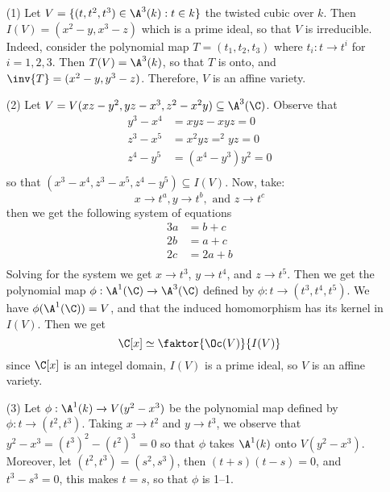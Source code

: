 \begin{example}\label{example_2.1}
  \begin{enumerate}
    \item[(1)] Let $V=\{(t,t^2,t^3) \in \A^3(k) : t \in k\}$ the twisted cubic
      over $k$. Then  $I(V)=(x^2-y,x^3-z)$ which is a prime ideal, so that $V$
      is irreducible. Indeed, consider the polynomial map $T=(t_1,t_2,t_3)$
      where $t_i: t \xrightarrow{} t^i$ for $i=1,2,3$. Then $T(V)=\A^3(k)$, so
      that $T$ is onto, and $\inv{T}=(x^2-y,y^3-z)$. Therefore, $V$ is an affine
      variety.

    \item[(2)] Let $V=V(xz-y^2,yz-x^3,z^2-x^2y) \subseteq \A^3(\C)$. Observe
      that
      \begin{align*}
        y^3-x^4 &=  xyz-xyz=0 \\
        z^3-x^5 &=  x^2yz=^2yz=0  \\
        z^4-y^5 &=(x^4-y^3)y^2=0  \\
      \end{align*}
      so that $(x^3-x^4,z^3-x^5,z^4-y^5) \subseteq I(V)$. Now, take:
      \begin{equation*}
        x \xrightarrow{} t^a, y \xrightarrow{} t^b, \text{ and } z
        \xrightarrow{} t^c
      \end{equation*}
      then we get the following system of equations
      \begin{align*}
        3a  &=  b+c \\
        2b  &=  a+c \\
        2c  &=  2a+b  \\
      \end{align*}
      Solving for the system we get $x \xrightarrow{} t^3$, $y \xrightarrow{}
      t^4$, and $z \xrightarrow{} t^5$. Then we get the polynomial map
      $\phi:\A^1(\C) \xrightarrow{} \A^3(\C)$ defined by $\phi:t \xrightarrow{}
      (t^3,t^4,t^5)$. We have $\phi(\A^1(\C))=V$, and that the induced
      homomorphism has its kernel in $I(V)$. Then we get
      \begin{equation*}
        \C[x] \simeq \faktor{\Oc(V)}{I(V)}
      \end{equation*}
      since $\C[x]$ is an integel domain, $I(V)$ is a prime ideal, so $V$ is an
      affine variety.

    \item[(3)] Let $\phi:\A^1(k) \xrightarrow{} V(y^2-x^3)$ be the polynomial
      map defined by $\phi:t \xrightarrow{} (t^2,t^3)$. Taking $x \xrightarrow{}
      t^2$ and $y \xrightarrow{} t^3$, we observe that
      $y^2-x^3=(t^3)^2-(t^2)^3=0$ so that $\phi$ takes $\A^1(k)$ onto
      $V(y^2-x^3)$. Moreover, let $(t^2,t^3)=(s^2,s^3)$, then $(t+s)(t-s)=0$, and
      $t^3-s^3=0$, this makes $t=s$, so that  $\phi$ is 1--1.


\end{enumerate}
\end{example}
